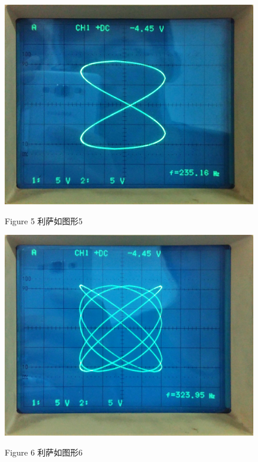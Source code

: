 \documentclass[a4paper,10pt,notitlepage]{report}
\begin{document}
\begin{figure}[htbp]
\centering

	\includegraphics[scale=.13]{L05.jpg}
	\begin{center}
		\scriptsize Figure 5 利萨如图形5
	\end{center}

\end{figure}
	
\begin{figure}[htbp]
\centering

	\includegraphics[scale=.1]{L06.jpg}
	\begin{center}
		\scriptsize Figure 6 利萨如图形6
	\end{center}

\end{figure}
	
\end{document}
